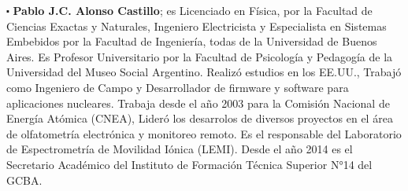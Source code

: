 $\centerdot$ \textbf{Pablo J.C. Alonso Castillo}; es Licenciado en Física, por la Facultad de Ciencias Exactas y Naturales, Ingeniero Electricista y Especialista en Sistemas Embebidos por la Facultad de Ingeniería, todas de la Universidad de Buenos Aires. Es Profesor Universitario  por la Facultad de Psicología y Pedagogía de la Universidad del Museo Social Argentino. Realizó estudios en los EE.UU., Trabajó como Ingeniero de Campo y Desarrollador de firmware y software para aplicaciones nucleares. Trabaja desde el año 2003 para la Comisión Nacional de Energía Atómica (CNEA), Lideró los desarrolos de diversos proyectos en el área de olfatometría electrónica y monitoreo remoto. Es el responsable del Laboratorio de Espectrometría de Movilidad Iónica (LEMI). Desde el año 2014 es el Secretario Académico del Instituto de Formación Técnica Superior N°14 del GCBA.